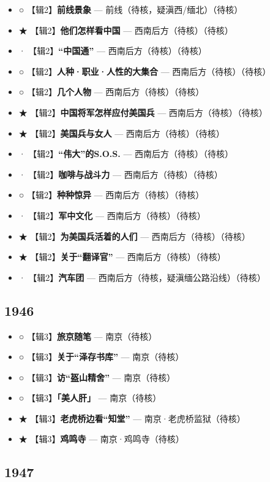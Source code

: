 \documentclass[UTF8,fontset=none,zihao=-4,a4paper]{ctexart}
\begin{document}
\begin{itemize}
\item ○ 【辑2】\textbf{前线景象} — 前线（待核，疑滇西/缅北）（待核）
\item ★ 【辑2】\textbf{他们怎样看中国} — 西南后方（待核）（待核）
\item · 【辑2】\textbf{“中国通”} — 西南后方（待核）（待核）
\item ○ 【辑2】\textbf{人种·职业·人性的大集合} — 西南后方（待核）（待核）
\item ○ 【辑2】\textbf{几个人物} — 西南后方（待核）（待核）
\item ★ 【辑2】\textbf{中国将军怎样应付美国兵} — 西南后方（待核）（待核）
\item ★ 【辑2】\textbf{美国兵与女人} — 西南后方（待核）（待核）
\item · 【辑2】\textbf{“伟大”的S.O.S.} — 西南后方（待核）（待核）
\item · 【辑2】\textbf{咖啡与战斗力} — 西南后方（待核）（待核）
\item ○ 【辑2】\textbf{种种惊异} — 西南后方（待核）（待核）
\item · 【辑2】\textbf{军中文化} — 西南后方（待核）（待核）
\item ★ 【辑2】\textbf{为美国兵活着的人们} — 西南后方（待核）（待核）
\item ★ 【辑2】\textbf{关于“翻译官”} — 西南后方（待核）（待核）
\item · 【辑2】\textbf{汽车团} — 西南后方（待核，疑滇缅公路沿线）（待核）
\end{itemize}


\subsection{1946}


\begin{itemize}
\item ○ 【辑3】\textbf{旅京随笔} — 南京（待核）
\item ○ 【辑3】\textbf{关于“泽存书库”} — 南京（待核）
\item ○ 【辑3】\textbf{访“盔山精舍”} — 南京（待核）
\item ○ 【辑3】\textbf{「美人肝」} — 南京（待核）
\item ★ 【辑3】\textbf{老虎桥边看“知堂”} — 南京·老虎桥监狱（待核）
\item ★ 【辑3】\textbf{鸡鸣寺} — 南京·鸡鸣寺（待核）
\end{itemize}


\subsection{1947}
\end{document}
